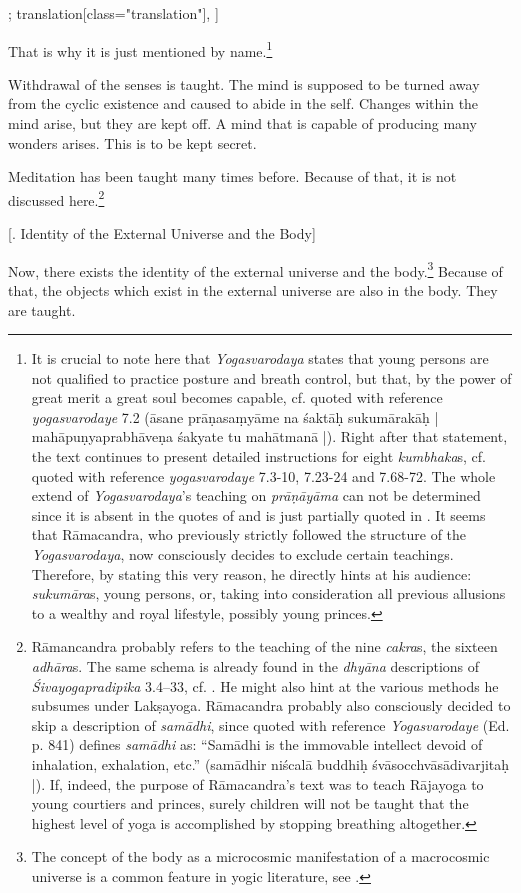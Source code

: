 \begin{alignment}[
  texts=edition[class="edition"];
  translation[class="translation"],
  ]
\begin{translation}
\begin{tlate}
      That is why it is just mentioned by name.\footnote{It is crucial to note here that \textit{Yogasvarodaya} states that young persons are not qualified to practice posture and breath control, but that, by the power of great merit a great soul becomes capable, cf.  quoted with reference \textit{yogasvarodaye} 7.2 (āsane prāṇasaṃyāme na śaktāḥ sukumārakāḥ | mahāpuṇyaprabhāveṇa śakyate tu mahātmanā |). Right after that statement, the text continues to present detailed instructions for eight \textit{kumbhaka}s, cf.  quoted with reference \textit{yogasvarodaye} 7.3-10, 7.23-24 and 7.68-72. The whole extend of \textit{Yogasvarodaya}'s teaching on \textit{prāṇāyāma} can not be determined since it is absent in the quotes of  and is just partially quoted in . It seems that Rāmacandra, who previously strictly followed the structure of the \textit{Yogasvarodaya}, now consciously decides to exclude certain teachings. Therefore, by stating this very reason, he directly hints at his audience: \textit{sukumāra}s, young persons, or, taking into consideration all previous allusions to a wealthy and royal lifestyle, possibly young princes.}
      
      Withdrawal of the senses is taught. The mind is supposed to be turned away from the cyclic existence and caused to abide in the self. Changes within the mind arise, but they are kept off. A mind that is capable of producing many wonders arises. This is to be kept secret.
      
Meditation has been taught many times before. Because of that, it is not discussed here.\footnote{Rāmancandra probably refers to the teaching of the nine \textit{cakra}s, the sixteen \textit{adhāra}s. The same schema is already found in the \textit{dhyāna} descriptions of \textit{Śivayogapradipika} 3.4–33, cf. \citeauthor[2023: pp. 165,212-215]{shivayogapradipika}. He might also hint at the various methods he subsumes under Lakṣayoga. Rāmacandra probably also consciously decided to skip a description of \textit{samādhi}, since  quoted with reference \textit{Yogasvarodaye} (Ed. p. 841) defines \textit{samādhi} as: ``Samādhi is the immovable intellect devoid of inhalation, exhalation, etc.'' (samādhir niścalā buddhiḥ śvāsocchvāsādivarjitaḥ |). If, indeed, the purpose of Rāmacandra's text was to teach Rājayoga to young courtiers and princes, surely children will not be taught that the highest level of yoga is accomplished by stopping breathing altogether.}
\end{tlate}
\begin{tlate}
\centerline{\textrm{\small{[. Identity of the External Universe and the Body]}}}
\bigskip
Now, there exists the identity of the external universe and the body.\footnote{The concept of the body as a microcosmic manifestation of a macrocosmic universe is a common feature in yogic literature, see \citeauthor[2017:174-178]{rootsofyoga2017}.} Because of that, the objects which exist in the external universe are also in the body. They are taught.


\end{tlate}
\end{translation}
\end{alignment}
